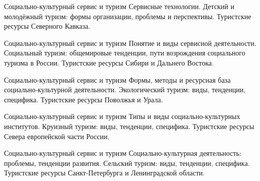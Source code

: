 \documentclass[
	11pt,
	a4paper,
	]
	{article}
\begin{document}
\begin{minipage}[t][\miniH]{\miniL}\centering
	 {Социально-культурный сервис и туризм}
		{
			Сервисные технологии.
		}{
			Детский и молодёжный туризм: формы организации, проблемы и перспективы.
		}{
			Туристские ресурсы Северного Кавказа.
		}
	\lowGE
\end{minipage}





\begin{minipage}[t][\miniH]{\miniL}\centering
	 {Социально-культурный сервис и туризм}
		{
			Понятие и виды сервисной деятельности.
		}{
			Социальный туризм: общемировые тенденции, пути возрождения социального туризма в России.
		}{
			Туристские ресурсы Сибири и Дальнего Востока.
		}
	\lowGE
\end{minipage}

\vfill



\begin{minipage}[t][\miniH]{\miniL}\centering
	 {Социально-культурный сервис и туризм}
		{
			Формы, методы и ресурсная база социально-культурной деятельности.
		}{
			Экологический туризм: виды, тенденции, специфика.
		}{
			Туристские ресурсы Поволжья и Урала.
		}
	\lowGE
\end{minipage}

\vfill



\begin{minipage}[t][\miniH]{\miniL}\centering
	 {Социально-культурный сервис и туризм}
		{
			Типы и виды социально-культурных институтов.
		}{
			Круизный туризм: виды, тенденции, специфика.
		}{
			Туристские ресурсы Севера европейской части России.
		}
	\lowGE
\end{minipage}





\begin{minipage}[t][\miniH]{\miniL}\centering
	 {Социально-культурный сервис и туризм}
		{
			Социально-культурная деятельность: проблемы, тенденции развития.
		}{
			Сельский туризм: виды, тенденции, специфика.
		}{
			Туристские ресурсы Санкт-Петербурга и Ленинградской области.
		}
	\lowGE
\end{minipage}

\vfill
\end{document}
